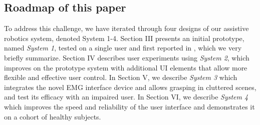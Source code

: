 \subsection{ Roadmap of this paper}

To address this challenge, we have iterated through four designs of our assistive robotics system, denoted System 1-4. Section III presents an initial prototype, named \emph{System 1}, tested on a single user and first reported in \cite{Weisz2012c}, which we very briefly summarize.  Section IV describes user experiments using \emph{System 2}, which improves on the prototype system with additional UI elements that allow more flexible and effective user control. In Section V, we describe \emph{System 3} which integrates the novel EMG interface device and allows grasping in cluttered scenes, and test its efficacy with an impaired user. In Section VI, we describe \emph{System 4} which improves the speed and reliability of the user interface and demonstrates it on a cohort of healthy subjects. 


















